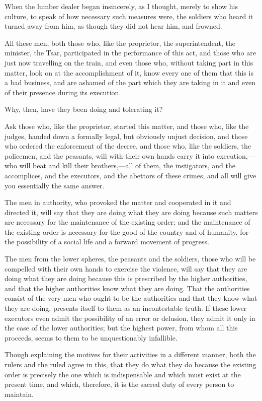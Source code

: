 \documentclass{book}
\begin{document}
When the lumber dealer began insincerely, as I thought, merely to show his culture, to speak of how necessary such measures were, the soldiers who heard it turned away from him, as though they did not hear him, and frowned.

All these men, both those who, like the proprietor, the superintendent, the minister, the Tsar, participated in the performance of this act, and those who are just now travelling on the train, and even those who, without taking part in this matter, look on at the accomplishment of it, know every one of them that this is a bad business, and are ashamed of the part which they are taking in it and even of their presence during its execution.

Why, then, have they been doing and tolerating it?

Ask those who, like the proprietor, started this matter, and those who, like the judges, handed down a formally legal, but obviously unjust decision, and those who ordered the enforcement of the decree, and those who, like the soldiers, the policemen, and the peasants, will with their own hands carry it into execution,—who will beat and kill their brothers,—all of them, the instigators, and the accomplices, and the executors, and the abettors of these crimes, and all will give you essentially the same answer.

The men in authority, who provoked the matter and cooperated in it and directed it, will say that they are doing what they are doing because such matters are necessary for the maintenance of the existing order; and the maintenance of the existing order is necessary for the good of the country and of humanity, for the possibility of a social life and a forward movement of progress.

The men from the lower spheres, the peasants and the soldiers, those who will be compelled with their own hands to exercise the violence, will say that they are doing what they are doing because this is prescribed by the higher authorities, and that the higher authorities know what they are doing. That the authorities consist of the very men who ought to be the authorities and that they know what they are doing, presents itself to them as an incontestable truth. If these lower executors even admit the possibility of an error or delusion, they admit it only in the case of the lower authorities; but the highest power, from whom all this proceeds, seems to them to be unquestionably infallible.

Though explaining the motives for their activities in a different manner, both the rulers and the ruled agree in this, that they do what they do because the existing order is precisely the one which is indispensable and which must exist at the present time, and which, therefore, it is the sacred duty of every person to maintain.
\end{document}
